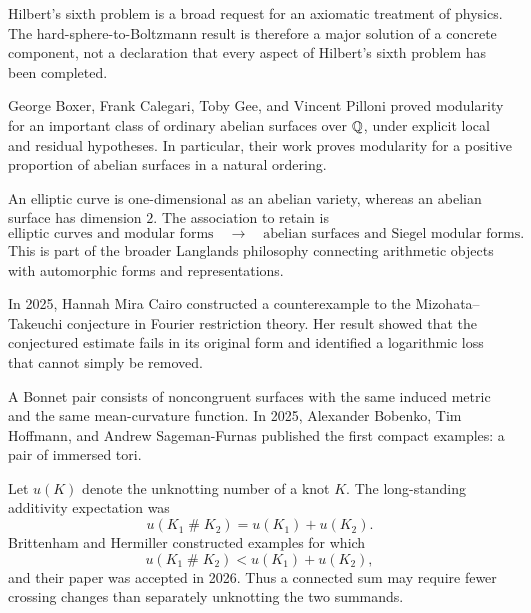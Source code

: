     \begin{remark}
        Hilbert's sixth problem is a broad request for an axiomatic treatment of
        physics. The hard-sphere-to-Boltzmann result is therefore a major
        solution of a concrete component, not a declaration that every aspect of
        Hilbert's sixth problem has been completed.
    \end{remark}

    \begin{fact}
        George Boxer, Frank Calegari, Toby Gee, and Vincent Pilloni proved
        modularity for an important class of ordinary abelian surfaces over
        $\mathbb{Q}$, under explicit local and residual hypotheses. In particular, their
        work proves modularity for a positive proportion of abelian surfaces in
        a natural ordering.
    \end{fact}

    \begin{idea}
        An elliptic curve is one-dimensional as an abelian variety, whereas an
        abelian surface has dimension $2$. The association to retain is
        \[
            \text{elliptic curves and modular forms}
            \quad\longrightarrow\quad
            \text{abelian surfaces and Siegel modular forms}.
        \]
        This is part of the broader Langlands philosophy connecting arithmetic
        objects with automorphic forms and representations.
    \end{idea}

    \begin{fact}
        In 2025, Hannah Mira Cairo constructed a counterexample to the
        Mizohata--Takeuchi conjecture in Fourier restriction theory. Her result
        showed that the conjectured estimate fails in its original form and
        identified a logarithmic loss that cannot simply be removed.
    \end{fact}

    \begin{fact}
        A Bonnet pair consists of noncongruent surfaces with the same induced
        metric and the same mean-curvature function. In 2025, Alexander Bobenko,
        Tim Hoffmann, and Andrew Sageman-Furnas published the first compact
        examples: a pair of immersed tori.
    \end{fact}

    \begin{fact}
        Let $u(K)$ denote the unknotting number of a knot $K$. The long-standing
        additivity expectation was
        \[
            u(K_1\mathbin{\#}K_2)
            =
            u(K_1)+u(K_2).
        \]
        Brittenham and Hermiller constructed examples for which
        \[
            u(K_1\mathbin{\#}K_2)
            <
            u(K_1)+u(K_2),
        \]
        and their paper was accepted in 2026. Thus a connected sum may require
        fewer crossing changes than separately unknotting the two summands.
    \end{fact}

